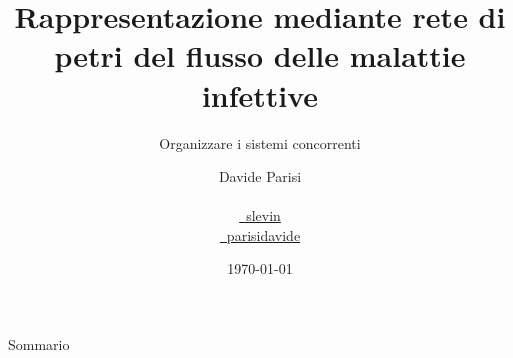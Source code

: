 \documentclass[trans]{beamer}
\title[Petri Nets Malinf]{Rappresentazione mediante rete di petri del flusso delle malattie infettive}
\subtitle{Organizzare i sistemi concorrenti}
\author[D.~Parisi]{Davide Parisi \\
  \email{\mail~davideparisi@gmail.com} \\
  \href{http://twitter.com/slevin}{\twitter~slevin} \\
  \href{http://it.linkedin.com/in/parisidavide/}{\linkedin~parisidavide}}
\date{
  \vspace{1em}
  \today
}
\begin{document}
{
  \begin{frame}[plain]
    \vspace{12em}
    \begin{titleBox}
      \maketitle
    \end{titleBox}
  \end{frame}
}

\begin{frame}{Sommario}
	\tableofcontents
\end{frame}


\end{document}
